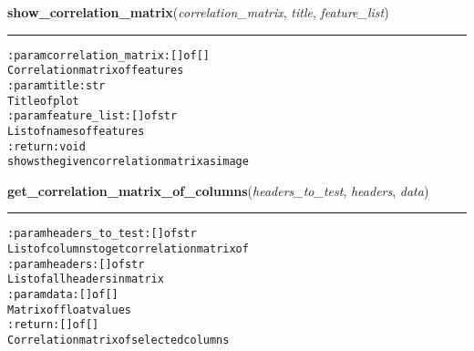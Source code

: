     \label{hal:ml:analysis:correlation:show_correlation_matrix}

    \vspace{0.5ex}

\hspace{.8\funcindent}\begin{boxedminipage}{\funcwidth}

    \raggedright \textbf{show\_correlation\_matrix}(\textit{correlation\_matrix}, \textit{title}, \textit{feature\_list})

    \vspace{-1.5ex}

    \rule{\textwidth}{0.5\fboxrule}
\setlength{\parskip}{2ex}
\begin{alltt}

:param correlation\_matrix: [] of []
    Correlation matrix of features
:param title: str
    Title of plot
:param feature\_list: [] of str
    List of names of features
:return: void
    shows the given correlation matrix as image
\end{alltt}

\setlength{\parskip}{1ex}
    \end{boxedminipage}

    \label{hal:ml:analysis:correlation:get_correlation_matrix_of_columns}

    \vspace{0.5ex}

\hspace{.8\funcindent}\begin{boxedminipage}{\funcwidth}

    \raggedright \textbf{get\_correlation\_matrix\_of\_columns}(\textit{headers\_to\_test}, \textit{headers}, \textit{data})

    \vspace{-1.5ex}

    \rule{\textwidth}{0.5\fboxrule}
\setlength{\parskip}{2ex}
\begin{alltt}

:param headers\_to\_test: [] of str
    List of columns to get correlation matrix of
:param headers: [] of str
    List of all headers in matrix
:param data: [] of []
    Matrix of float values
:return: [] of []
    Correlation matrix of selected columns
\end{alltt}

\setlength{\parskip}{1ex}
    \end{boxedminipage}

